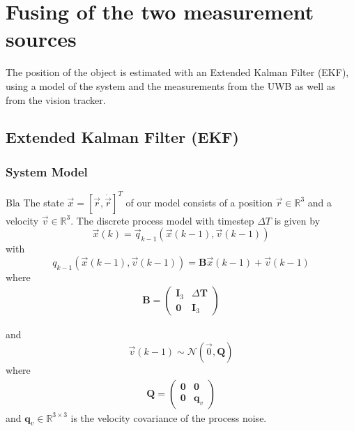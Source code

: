 \chapter{Fusing of the two measurement sources}\label{ch:fusing}

The position of the object is estimated with an Extended Kalman Filter (EKF), using a model of the system and the measurements from the UWB as well as from the vision tracker.

\section{Extended Kalman Filter (EKF)}

\subsection{System Model}

Bla The state $\vec x = [\vec r, \dot{\vec{r}}]^T$ of our model consists of a position $\vec r \in \mathbb{R}^3$ and a velocity $\vec v \in \mathbb{R}^3$.
The discrete process model with timestep $\Delta T$ is given by
\begin{equation}
	\vec x(k) = \vec q_{k-1}(\vec x(k-1), \vec v(k-1))
\end{equation}
with
\begin{equation}
  q_{k-1}(\vec x(k-1), \vec v(k-1)) = \textbf{B} \vec x(k-1) + \vec v(k-1)
\end{equation}
where 
\begin{align}
	\textbf{B} =
	\begin{pmatrix}
		\textbf{I}_3 & \Delta \textbf{T}\\
		\textbf{0} & \textbf{I}_3
	\end{pmatrix}
\end{align} 

and
\begin{equation}
	\vec v(k-1) \sim \mathcal{N}(\vec 0, \textbf{Q})
\end{equation}
where
\begin{align}
	\textbf{Q} =
	\begin{pmatrix}
		\textbf{0} & \textbf{0}\\
		\textbf{0} & \textbf{q}_v
	\end{pmatrix}
\end{align}
and $\textbf{q}_v \in \mathbb{R}^{3\times3}$ is the velocity covariance of the process noise.

